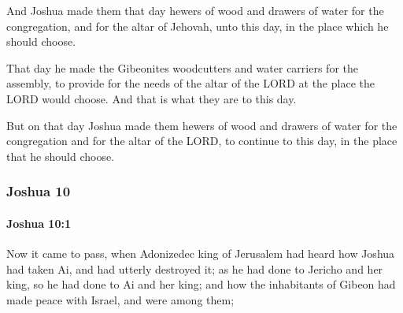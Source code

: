			\begin{versebox}
					\item[BHS] 
					\item[ASV] And Joshua made them that day hewers of wood and drawers of water for the congregation, and for the altar of Jehovah, unto this day, in the place which he should choose.
					\item[NIV] That day he made the Gibeonites woodcutters and water carriers for the assembly, to provide for the needs of the altar of the LORD at the place the LORD would choose. And that is what they are to this day.
					\item[NRSV] But on that day Joshua made them hewers of wood and drawers of water for the congregation and for the altar of the LORD, to continue to this day, in the place that he should choose.
			\end{versebox}
	\subsubsection{Joshua 10} %
		\label{JOSHUA-10}

		\paragraph{Joshua 10:1} %
			\label{JOSHUA-10-1}

			Now it came to pass, when Adonizedec king of Jerusalem had heard how Joshua had taken Ai, and had utterly destroyed it; as he had done to Jericho and her king, so he had done to Ai and her king; and how the inhabitants of Gibeon had made peace with Israel, and were among them;

